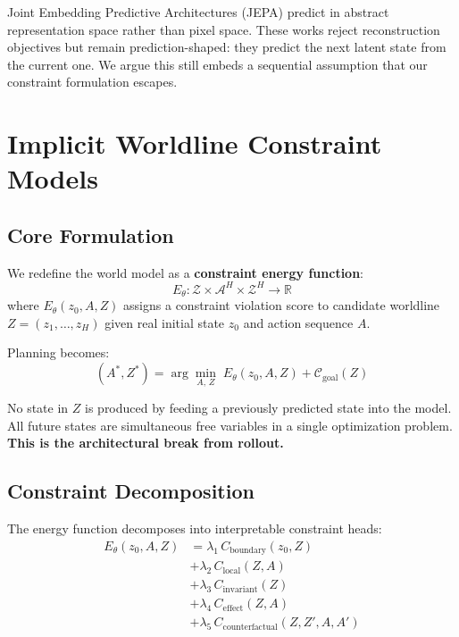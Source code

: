 \documentclass[12pt]{article}
\begin{document}
Joint Embedding Predictive Architectures (JEPA) \citep{lecun2022path} predict in abstract representation space rather than pixel space. These works reject reconstruction objectives but remain prediction-shaped: they predict the next latent state from the current one. We argue this still embeds a sequential assumption that our constraint formulation escapes.

\section{Implicit Worldline Constraint Models}
\label{sec:iwcm}

\subsection{Core Formulation}

We redefine the world model as a \textbf{constraint energy function}:
\[
  E_\theta : \mathcal{Z} \times \mathcal{A}^H \times \mathcal{Z}^H \to \mathbb{R}
\]
where $E_\theta(z_0, A, Z)$ assigns a constraint violation score to candidate worldline $Z = (z_1, \ldots, z_H)$ given real initial state $z_0$ and action sequence $A$.

Planning becomes:
\[
  (A^*, Z^*) = \arg\min_{A,\, Z}\; E_\theta(z_0, A, Z) + \mathcal{C}_{\text{goal}}(Z)
\]

No state in $Z$ is produced by feeding a previously predicted state into the model. All future states are simultaneous free variables in a single optimization problem. \textbf{This is the architectural break from rollout.}

\subsection{Constraint Decomposition}

The energy function decomposes into interpretable constraint heads:
\begin{align}
  E_\theta(z_0, A, Z) &= \lambda_1\, C_\text{boundary}(z_0, Z) \nonumber\\
  &+ \lambda_2\, C_\text{local}(Z, A) \nonumber\\
  &+ \lambda_3\, C_\text{invariant}(Z) \nonumber\\
  &+ \lambda_4\, C_\text{effect}(Z, A) \nonumber\\
  &+ \lambda_5\, C_\text{counterfactual}(Z, Z', A, A')
\end{align}
\end{document}
